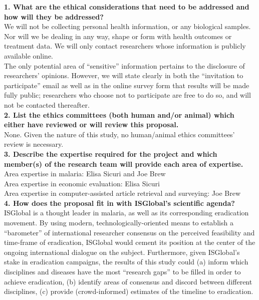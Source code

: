 \documentclass{article}
\begin{document}
\noindent \textbf{1. What are the ethical considerations that need to be addressed and how will they be addressed?} \\
We will not be collecting personal health information, or any biological samples. Nor will we be dealing in any way, shape or form with health outcomes or treatment data.
We will only contact researchers whose information is publicly available online.   \\

\noindent The only potential area of “sensitive” information pertains to the disclosure of researchers’ opinions. However, we will state clearly in both the “invitation to participate” email as well as in the online survey form that results will be made fully public; researchers who choose not to participate are free to do so, and will not be contacted thereafter.  \\


\noindent \textbf{2. List the ethics committees (both human and/or animal) which either have reviewed or will review this proposal.} \\


\noindent None. Given the nature of this study, no human/animal ethics committees’ review is necessary. \\

\noindent \textbf{3. Describe the expertise required for the project and which member(s) of the research team will provide each area of expertise.} \\


\noindent Area expertise in malaria: Elisa Sicuri and Joe Brew \\
\noindent Area expertise in economic evaluation: Elisa Sicuri \\
\noindent Area expertise in computer-assisted article retrieval and surveying: Joe Brew \\


\noindent \textbf{4. How does the proposal fit in with ISGlobal’s scientific agenda?} \\ 


\noindent ISGlobal is a thought leader in malaria, as well as its corresponding eradication movement. By using modern, technologically-oriented means to establish a “barometer” of international researcher consensus on the perceived feasibility and time-frame of eradication, ISGlobal would cement its position at the center of the ongoing international dialogue on the subject. Furthermore, given ISGlobal’s stake in eradication campaigns, the results of this study could (a) inform which disciplines and diseases have the most “research gaps” to be filled in order to achieve eradication, (b) identify areas of consensus and discord between different disciplines, (c) provide (crowd-informed) estimates of the timeline to eradication. \\
\end{document}
